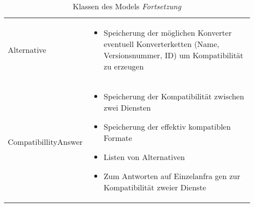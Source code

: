 \begin{table}
\begin{tabularx}{\textwidth}{p{} | X}
		Alternative & \compress \begin{itemize}
			\item Speicherung der möglichen Konverter eventuell Konverterketten (Name, Versionsnummer, ID) um Kompatibilität zu erzeugen
		\end{itemize}\\
		\rowcolor[HTML]{E7E7E7}
		CompatibillityAnswer & \compress \begin{itemize}
			\item Speicherung der Kompatibilität zwischen zwei Diensten
			\item Speicherung der effektiv kompatiblen Formate
			\item Listen von Alternativen
			\item Zum Antworten auf Einzelanfra
			gen zur Kompatibilität zweier Dienste
		\end{itemize}\\
	\end{tabularx}
	\caption{Klassen des Models \textit{Fortsetzung}}
\end{table}
